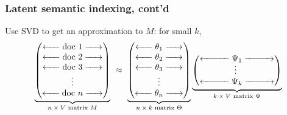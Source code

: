 \documentclass[smaller]{beamer}
\def\darkred{\color{red!70!black}}
\begin{document}
\begin{frame}
\frametitle{Latent semantic indexing, cont'd}

{\darkred Use SVD to get an approximation to $M$: for small $k$,}
$$
\underbrace{\begin{pmatrix} 
\xleftarrow{\hspace*{.5cm}} \text{doc 1} \xrightarrow{\hspace*{.5cm}} \\
\xleftarrow{\hspace*{.5cm}} \text{doc 2} \xrightarrow{\hspace*{.5cm}} \\
\xleftarrow{\hspace*{.5cm}} \text{doc 3} \xrightarrow{\hspace*{.5cm}} \\
\vdots \\
\xleftarrow{\hspace*{.5cm}} \text{doc $n$} \xrightarrow{\hspace*{.5cm}} 
\end{pmatrix}}_{\text{$n \times V$ matrix $M$}}
\ \approx \ 
\underbrace{\begin{pmatrix}
\xleftarrow{\hspace*{0.5cm}} \theta_1 \xrightarrow{\hspace*{0.5cm}} \\
\xleftarrow{\hspace*{0.5cm}} \theta_2 \xrightarrow{\hspace*{0.5cm}} \\
\xleftarrow{\hspace*{0.5cm}} \theta_3 \xrightarrow{\hspace*{0.5cm}} \\
\vdots \\
\xleftarrow{\hspace*{0.5cm}} \theta_n \xrightarrow{\hspace*{0.5cm}} 
\end{pmatrix}}_{\text{$n \times k$ matrix $\Theta$}}
\underbrace{\begin{pmatrix} 
\xleftarrow{\hspace*{1cm}} \Psi_1 \xrightarrow{\hspace*{1cm}} \\[-.05in]
\vdots \  \\
\xleftarrow{\hspace*{1cm}} \Psi_k \xrightarrow{\hspace*{1cm}} 
\end{pmatrix}}_{\text{$k \times V$ matrix $\Psi$}}
$$


\end{frame}
\end{document}
